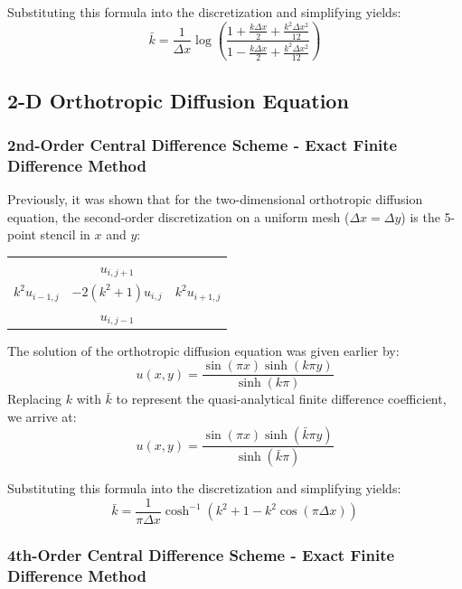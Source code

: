 \documentclass[10pt]{article}		%
\numberwithin{equation}{section}
\begin{document}
Substituting this formula into the discretization and simplifying yields:
\begin{equation}
\bar{k} = \frac{1}{\Delta x} \log\left(\frac{1+\frac{k\Delta x}{2}+\frac{k^2\Delta x^2}{12}}{1-\frac{k\Delta x}{2}+\frac{k^2\Delta x^2}{12}}\right)
\end{equation}

\subsection{2-D Orthotropic Diffusion Equation}

\subsubsection{2nd-Order Central Difference Scheme - Exact Finite Difference Method}

Previously, it was shown that for the two-dimensional orthotropic diffusion equation, the second-order discretization on a uniform mesh ($\Delta x = \Delta y$) is the 5-point stencil in $x$ and $y$:
\begin{table}[H]
	\begin{tabular}{ccc}
		& $u_{i, j+1}$ &  \\
		$k^2u_{i-1, j}$ & $-2(k^2+1)u_{i, j}$ & $k^2u_{i+1, j}$ \\
		& $u_{i, j-1}$ & 
	\end{tabular}
\end{table}

The solution of the orthotropic diffusion equation was given earlier by:
\begin{equation}
u(x, y) = \frac{\sin(\pi x) \sinh(k\pi y)}{\sinh(k\pi)}
\end{equation}
Replacing $k$ with $\bar{k}$ to represent the quasi-analytical finite difference coefficient, we arrive at:
\begin{equation}
u(x, y) = \frac{\sin(\pi x) \sinh(\bar{k}\pi y)}{\sinh(\bar{k}\pi)}
\end{equation}

Substituting this formula into the discretization and simplifying yields:
\begin{equation}
\bar{k} = \frac{1}{\pi\Delta x} \cosh^{-1} \left(k^2+1-k^2\cos(\pi\Delta x)\right)
\end{equation}

\subsubsection{4th-Order Central Difference Scheme - Exact Finite Difference Method}
\end{document}
